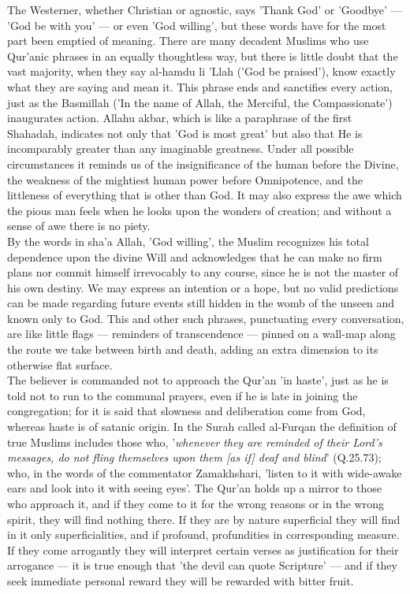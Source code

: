 \documentclass[10pt, twoside]{book}
\begin{document}
The Westerner, whether Christian or agnostic, says 'Thank God' or 'Goodbye' --- 'God be with you' --- or 
even 'God willing', but these words have for the most part been emptied of meaning. There are many 
decadent Muslims who use Qur'anic phrases in an equally thoughtless way, but there is little doubt 
that the vast majority, when they say al\hyp{}hamdu li 'Llah ('God be praised'), know exactly what they 
are saying and mean it. This phrase ends and sanctifies every action, just as the Basmillah ('In the 
name of Allah, the Merciful, the Compassionate') inaugurates action. Allahu akbar, which is like a 
paraphrase of the first Shahadah, indicates not only that 'God is most great' but also that He is 
incomparably greater than any imaginable greatness. Under all possible circumstances it reminds us of 
the insignificance of the human before the Divine, the weakness of the mightiest human power before 
Omnipotence, and the littleness of everything that is other than God. It may also express the awe 
which the pious man feels when he looks upon the wonders of creation; and without a sense of awe 
there is no piety. \\

By the words in sha'a Allah, 'God willing', the Muslim recognizes his total dependence upon the 
divine Will and acknowledges that he can make no firm plans nor commit himself irrevocably to any 
course, since he is not the master of his own destiny. We may express an intention or a hope, but no 
valid predictions can be made regarding future events still hidden in the womb of the unseen and 
known only to God. This and other such phrases, punctuating every conversation, are like little flags 
--- reminders of transcendence --- pinned on a wall-map along the route we take between birth and death, adding an extra dimension to its otherwise flat surface. \\

The believer is commanded not to approach the Qur'an 'in haste', just as he is told not to run to the 
communal prayers, even if he is late in joining the congregation; for it is said that slowness and 
deliberation come from God, whereas haste is of satanic origin. In the Surah called al\hyp{}Furqan the 
definition of true Muslims includes those who, '\emph{whenever they are reminded of their Lord's messages, do not fling themselves upon them [as if] deaf and blind}' (Q.25.73); who, in the words of the 
commentator Zamakhshari, 'listen to it with wide\hyp{}awake ears and look into it with seeing eyes'. The 
Qur'an holds up a mirror to those who approach it, and if they come to it for the wrong reasons or in 
the wrong spirit, they will find nothing there. If they are by nature superficial they will find in 
it only superficialities, and if profound, profundities in corresponding measure. If they come 
arrogantly they will interpret certain verses as justification for their arrogance --- it is true 
enough that 'the devil can quote Scripture' --- and if they seek immediate personal reward they will be 
rewarded with bitter fruit. \\
\end{document}
